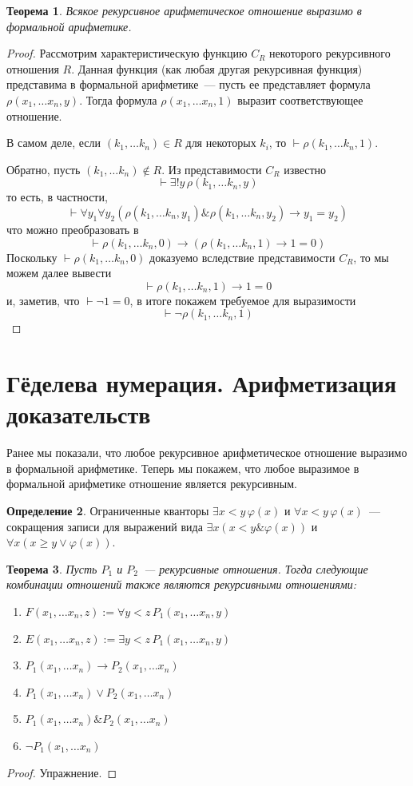 \documentclass[a4paper,11pt]{article}
\newtheorem{thm}{Теорема}[section]
\theoremstyle{definition}
\newtheorem{dfn}[thm]{Определение}
\newcommand{\proves}{\vdash}
\newcommand{\amp}{\mathbin{\&}}
\begin{document}
\begin{thm}
Всякое рекурсивное арифметическое отношение выразимо в формальной арифметике.
\end{thm}
\begin{proof}
Рассмотрим характеристическую функцию $C_R$ некоторого рекурсивного отношения
$R$. Данная функция (как любая другая рекурсивная функция) представима в
формальной арифметике~--- пусть ее представляет формула $\rho(x_1, \dots x_n,
y)$. Тогда формула $\rho(x_1, \dots x_n, 1)$ выразит соответствующее отношение.

В самом деле, если $(k_1, \dots k_n) \in R$ для некоторых $k_i$, то $\proves
\rho(k_1, \dots k_n, 1)$.

Обратно, пусть $(k_1, \dots k_n) \notin R$. Из представимости $C_R$ известно
\[ \proves \exists!y\,\rho(k_1, \dots k_n, y) \]
то есть, в частности,
\[ \proves \forall y_1\forall y_2(\rho(k_1, \dots k_n, y_1) \amp \rho(k_1, \dots k_n, y_2) \to y_1 = y_2) \]
что можно преобразовать в
\[ \proves \rho(k_1, \dots k_n, 0) \to (\rho(k_1, \dots k_n, 1) \to 1 = 0) \]
Поскольку $\proves \rho(k_1, \dots k_n, 0)$ доказуемо вследствие представимости
$C_R$, то мы можем далее вывести
\[ \proves \rho(k_1, \dots k_n, 1) \to 1 = 0 \]
и, заметив, что $\proves \neg 1 = 0$, в итоге покажем требуемое для выразимости
\[ \proves \neg\rho(k_1, \dots k_n, 1) \]
\end{proof}

\section{Гёделева нумерация. Арифметизация доказательств}
Ранее мы показали, что любое рекурсивное арифметическое отношение выразимо в
формальной арифметике. Теперь мы покажем, что любое выразимое в формальной
арифметике отношение является рекурсивным.

\begin{dfn}
Ограниченные кванторы $\exists x{<}y\,\varphi(x)$ и $\forall x{<}y\,\varphi(x)$~---
сокращения записи для выражений вида $\exists x(x < y \amp \varphi(x))$ и
$\forall x(x \ge y \vee \varphi(x))$.
\end{dfn}

\begin{thm}
Пусть $P_1$ и $P_2$~--- рекурсивные отношения. Тогда следующие комбинации
отношений также являются рекурсивными отношениями:
\begin{enumerate}
\item $F(x_1, \dots x_n, z) := \forall y{<}z\,P_1(x_1, \dots x_n, y)$
\item $E(x_1, \dots x_n, z) := \exists y{<}z\,P_1(x_1, \dots x_n, y)$
\item $P_1(x_1, \dots x_n) \to P_2(x_1, \dots x_n)$
\item $P_1(x_1, \dots x_n) \vee P_2(x_1, \dots x_n)$
\item $P_1(x_1, \dots x_n) \amp P_2(x_1, \dots x_n)$
\item $\neg P_1(x_1, \dots x_n)$
\end{enumerate}
\end{thm}
\begin{proof}
Упражнение.
\end{proof}
\end{document}
